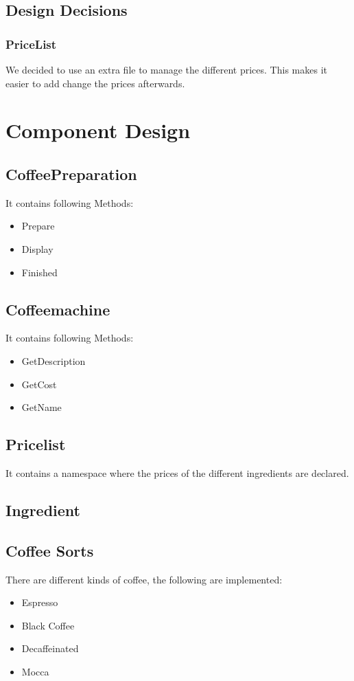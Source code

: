 \subsection{Design Decisions}
\subsubsection{PriceList}
We decided to use an extra file to manage the different prices. This makes it easier to add change the prices afterwards.

\section{Component Design}
\subsection{CoffeePreparation}
It contains following Methods:
\begin{itemize}
	\item Prepare
	\item Display
	\item Finished
\end{itemize}


\subsection{Coffeemachine}
It contains following Methods:
\begin{itemize}
	\item GetDescription
	\item GetCost
	\item GetName
\end{itemize}

\subsection{Pricelist}
It contains a namespace where the prices of the different ingredients are declared.

\subsection{Ingredient}

\subsection{Coffee Sorts}
There are different kinds of coffee, the following are implemented:
\begin{itemize}
	\item Espresso
	\item Black Coffee
	\item Decaffeinated
	\item Mocca
\end{itemize}

